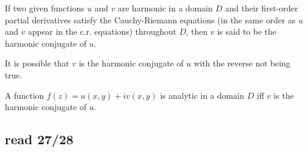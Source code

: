 \documentclass{article}
\begin{document}
\begin{definition}
	If two given functions \(u\) and \(v\) are harmonic in a domain \(D\) and their first-order partial derivatives satisfy the Cauchy-Riemann equations (in the same order as \(u\) and \(v\) appear in the c.r. equations) throughout \(D\), then \(v\) is said to be the harmonic conjugate of \(u\).
\end{definition}
\begin{remark}
	It is possible that \(v\) is the harmonic conjugate of \(u\) with the reverse not being true.
\end{remark}
\begin{theorem}
	A function \(f(z)=u(x,y)+iv(x,y)\) is analytic in a domain \(D\) iff \(v\) is the harmonic conjugate of \(u\).
\end{theorem}
\subsection{read 27/28}
\end{document}
